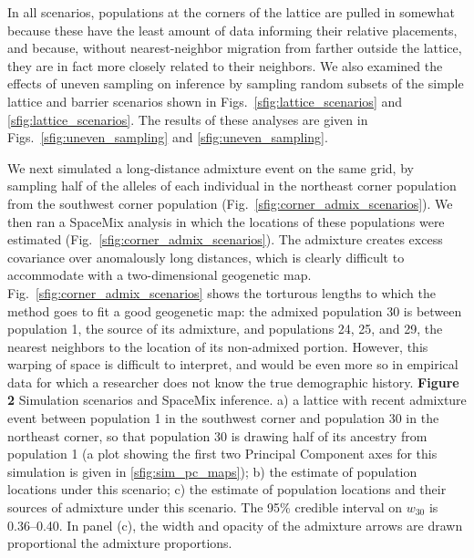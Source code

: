 \documentclass[10pt,letterpaper]{article}
\begin{document}
In all scenarios, populations at the corners of the lattice are pulled in somewhat
because these have the least amount of data informing their relative placements, and because, without nearest-neighbor migration from farther outside the lattice, they are in fact more closely related to their neighbors.  We also examined the effects of uneven sampling on inference by sampling random subsets of the simple lattice and barrier scenarios shown in Figs.\ \ref{sfig:lattice_scenarios} and \ref{sfig:lattice_scenarios}.  The results of these analyses are given in Figs.\ \ref{sfig:uneven_sampling} and \ref{sfig:uneven_sampling}.

We next simulated a long-distance admixture event on the same grid,
by sampling half of the alleles of each individual in the northeast corner population from the southwest corner population (Fig.\ \ref{sfig:corner_admix_scenarios}).  We then ran a SpaceMix analysis in which the locations of these populations were estimated (Fig.\ \ref{sfig:corner_admix_scenarios}).
The admixture creates excess covariance over anomalously long distances, which is clearly difficult to accommodate with a two-dimensional geogenetic map.
Fig.\ \ref{sfig:corner_admix_scenarios} shows the torturous lengths to which the method goes to fit a good geogenetic map: the admixed population 30 is between population 1, the source of its admixture, and populations 24, 25, and 29, the nearest neighbors to the location of its non-admixed portion.
However, this warping of space is difficult to interpret, and would be even more so in empirical data for which a researcher does not know the true demographic history.  
%
\newline\newline
{\bf{Figure 2}} Simulation scenarios and SpaceMix inference.  a) a lattice with recent admixture event between population 1 in the southwest corner and population 30 in the northeast corner, so that population 30 is drawing half of its ancestry from population 1 (a plot showing the first two Principal Component axes for this simulation is given in \ref{sfig:sim_pc_maps}); b) the estimate of population locations under this scenario; c) the estimate of population locations and their sources of admixture under this scenario.  The 95\% credible interval on $w_{30}$ is 0.36--0.40. In panel (c), the width and opacity of the admixture arrows are drawn proportional the admixture proportions.
\newline\newline
\end{document}

